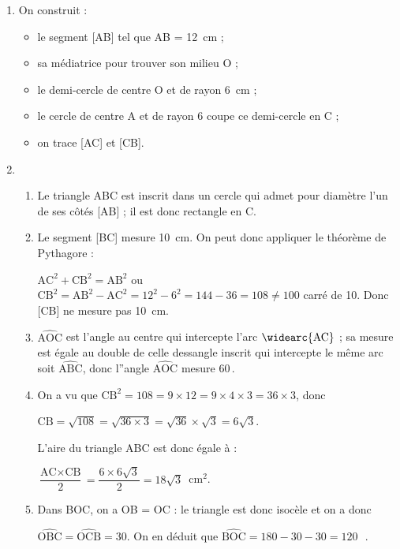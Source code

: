 
\medskip

%
%
%

\begin{enumerate}
\item %
On construit :

\begin{itemize}
\item le segment [AB] tel que AB = 12~cm ;
\item sa médiatrice pour trouver son milieu O ;
\item le demi-cercle de centre O et de rayon 6~cm ;
\item le cercle de centre A et de rayon 6 coupe ce demi-cercle en C ;
\item on trace [AC] et [CB].
\end{itemize}

\item %
	\begin{enumerate}
		\item %
Le triangle ABC est inscrit dans un cercle qui admet pour diamètre l'un de ses côtés [AB] ; il est donc rectangle en C.
		\item Le segment [BC] mesure 10~cm.
On peut donc appliquer le théorème de Pythagore :

$\text{AC}^2 + \text{CB}^2 = \text{AB}^2$ ou $\text{CB}^2 = \text{AB}^2 - \text{AC}^2 = 12^2 - 6^2 = 144 - 36 = 108 \ne 100$ carré de 10. Donc [CB] ne mesure pas 10~cm.
		\item %
$\widehat{\text{AOC}}$ est l'angle au centre qui intercepte l'arc $\widearc{\text{AC}}$ ; sa mesure est égale au double de celle dessangle inscrit qui intercepte le même arc soit $\widehat{\text{ABC}}$, donc l''angle $\widehat{\text{AOC}}$ mesure 60\,\degres.
		\item %
On a vu que $\text{CB}^2 = 108 = 9 \times 12 = 9 \times 4 \times 3 = 36 \times 3$, donc 

$\text{CB} = \sqrt{108} = \sqrt{36 \times 3} = \sqrt{36} \times \sqrt{3} = 6\sqrt{3}$.

L'aire du triangle ABC est donc égale à :

$\dfrac{\text{AC} \times \text{CB}}{2} = \dfrac{6 \times 6\sqrt{3}}{2} = 18\sqrt{3}$~cm$^2$.
		\item %
		Dans BOC, on a OB = OC : le triangle est donc isocèle et on a donc 
		
		$\widehat{\text{OBC}} = \widehat{\text{OCB}} = 30$. On en déduit que $\widehat{\text{BOC}} = 180 - 30 - 30 = 120$~\,\degres.
	\end{enumerate}
\end{enumerate}

\vspace{0.5cm}

